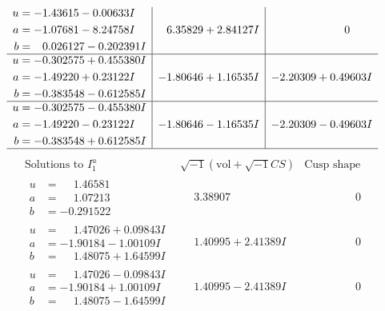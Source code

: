 \documentclass[1p]{elsarticle_modified}
\theoremstyle{definition}
\newcommand{\I}{\sqrt{-1}}
\begin{document}
$$\begin{array}{c|c|c}
\begin{aligned}
u &= -1.43615 - 0.00633 I \\
a &= -1.07681 - 8.24758 I \\
b &= \phantom{-}0.026127 - 0.202391 I\end{aligned}
 & \phantom{-}6.35829 + 2.84127 I & \phantom{-0.000000 } 0 \\ \hline\begin{aligned}
u &= -0.302575 + 0.455380 I \\
a &= -1.49220 + 0.23122 I \\
b &= -0.383548 - 0.612585 I\end{aligned}
 & -1.80646 + 1.16535 I & -2.20309 + 0.49603 I \\ \hline\begin{aligned}
u &= -0.302575 - 0.455380 I \\
a &= -1.49220 - 0.23122 I \\
b &= -0.383548 + 0.612585 I\end{aligned}
 & -1.80646 - 1.16535 I & -2.20309 - 0.49603 I\\
 \hline 
 \end{array}$$\newpage$$\begin{array}{c|c|c}  
\text{Solutions to }I^u_{1}& \I (\text{vol} + \sqrt{-1}CS) & \text{Cusp shape}\\
 \hline 
\begin{aligned}
u &= \phantom{-}1.46581\phantom{ +0.000000I} \\
a &= \phantom{-}1.07213\phantom{ +0.000000I} \\
b &= -0.291522\phantom{ +0.000000I}\end{aligned}
 & \phantom{-}3.38907\phantom{ +0.000000I} & \phantom{-0.000000 } 0 \\ \hline\begin{aligned}
u &= \phantom{-}1.47026 + 0.09843 I \\
a &= -1.90184 - 1.00109 I \\
b &= \phantom{-}1.48075 + 1.64599 I\end{aligned}
 & \phantom{-}1.40995 + 2.41389 I & \phantom{-0.000000 } 0 \\ \hline\begin{aligned}
u &= \phantom{-}1.47026 - 0.09843 I \\
a &= -1.90184 + 1.00109 I \\
b &= \phantom{-}1.48075 - 1.64599 I\end{aligned}
 & \phantom{-}1.40995 - 2.41389 I & \phantom{-0.000000 } 0 \\ \hline\begin{aligned}

\end{aligned}
\end{array}$$
\end{document}
